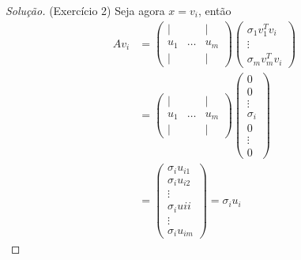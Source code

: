 \documentclass[a4paper,10pt]{article}
\newenvironment{solution}
  {\begin{proof}[Solução]}
  {\end{proof}}
\begin{document}
\begin{solution}{(Exercício 2)}
    Seja agora $x = v_i$, então
    \begin{equation*}
      \begin{split}
        Av_i &= \begin{pmatrix}
            \vert & & \vert \\
            u_1 & \dots & u_m \\
            \vert & & \vert
          \end{pmatrix}
          \begin{pmatrix}
            \sigma_1v_1^Tv_i \\
            \vdots \\
            \sigma_mv_m^Tv_i
          \end{pmatrix}  \\
          &= \begin{pmatrix}
              \vert & & \vert \\
              u_1 & \dots & u_m \\
              \vert & & \vert
            \end{pmatrix}
            \begin{pmatrix}
              0 \\
              0 \\
              \vdots \\
              \sigma_i \\
              0 \\
              \vdots \\
              0
            \end{pmatrix} \\
          &= \begin{pmatrix}
            \sigma_iu_{i1} \\
            \sigma_iu_{i2} \\
            \vdots \\
            \sigma_iu{ii} \\
            \vdots \\
            \sigma_iu_{im}
          \end{pmatrix} = \sigma_iu_i
      \end{split}
    \end{equation*}


\end{solution}
\end{document}
